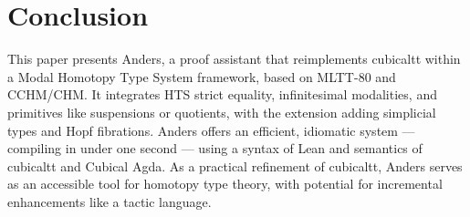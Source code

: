\documentclass{article}
\begin{document}
\section{Conclusion}

This paper presents Anders, a proof assistant that reimplements
cubicaltt within a Modal Homotopy Type System framework, based
on MLTT-80 and CCHM/CHM. It integrates HTS strict equality,
infinitesimal modalities, and primitives like suspensions or quotients,
with the extension adding simplicial types and Hopf fibrations.
Anders offers an efficient, idiomatic system — compiling in under
one second — using a syntax of Lean and semantics of cubicaltt and Cubical Agda.
As a practical refinement of cubicaltt, Anders serves as an accessible
tool for homotopy type theory, with potential for incremental
enhancements like a tactic language.
\end{document}
